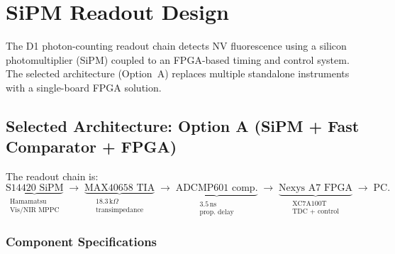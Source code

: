 %

\section{SiPM Readout Design}
\label{sec:sipm-readout}

The D1 photon-counting readout chain detects NV fluorescence using a silicon photomultiplier
(SiPM) coupled to an FPGA-based timing and control system. The selected architecture
(Option~A) replaces multiple standalone instruments with a single-board FPGA solution.

\subsection{Selected Architecture: Option A (SiPM + Fast Comparator + FPGA)}

The readout chain is:
\begin{equation*}
  \underbrace{\text{S14420 SiPM}}_{\substack{\text{Hamamatsu}\\\text{Vis/NIR MPPC}}}
  \;\to\;
  \underbrace{\text{MAX40658 TIA}}_{\substack{18.3\,\mathrm{k}\Omega\\\text{transimpedance}}}
  \;\to\;
  \underbrace{\text{ADCMP601 comp.}}_{\substack{3.5\,\mathrm{ns}\\\text{prop. delay}}}
  \;\to\;
  \underbrace{\text{Nexys A7 FPGA}}_{\substack{\text{XC7A100T}\\\text{TDC + control}}}
  \;\to\; \text{PC}.
\end{equation*}

\subsubsection{Component Specifications}

